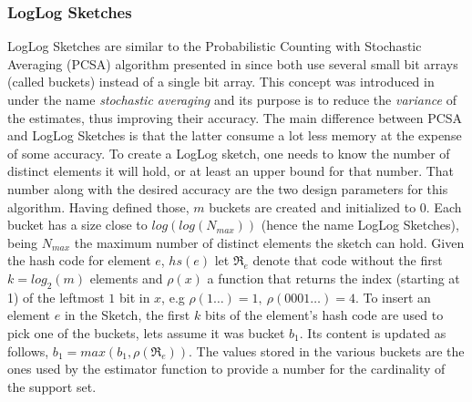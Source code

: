 \subsubsection{LogLog Sketches}
\label{sec:loglog-sketches}
LogLog Sketches \cite{Durand:2003tc} are similar to the Probabilistic
Counting with Stochastic Averaging (PCSA) algorithm presented in
\cite{Flajolet:1985wd} since both use several small bit arrays (called
buckets) instead of a single bit array. This concept was introduced in
\cite{Flajolet:1985wd} under the name \emph{stochastic averaging} and
its purpose is to reduce the \emph{variance} of the estimates, thus
improving their accuracy. The main difference between PCSA and LogLog
Sketches is that the latter consume a lot less memory at the expense
of some accuracy. To create a LogLog sketch, one needs to know the
number of distinct elements it will hold, or at least an upper bound
for that number. That number along with the desired accuracy are the
two design parameters for this algorithm. Having defined those, $m$
buckets are created and initialized to $0$. Each bucket has a size
close to $log(log(N_{max}))$ (hence the name LogLog Sketches), being
$N_{max}$ the maximum number of distinct elements the sketch can hold.
Given the hash code for element $e$, $hs(e)$ let $\mathfrak{R}_e$
denote that code without the first $k=log_2(m)$ elements and $\rho(x)$
a function that returns the index (starting at 1) of the leftmost $1$
bit in $x$, e.g $\rho(1\ldots)=1,\ \rho(0001\ldots)=4$. To insert an
element $e$ in the Sketch, the first $k$ bits of the element's hash
code are used to pick one of the buckets, lets assume it was bucket
$b_1$. Its content is updated as follows,
$b_1=max(b_1,\rho(\mathfrak{R}_e))$. The values stored in the various
buckets are the ones used by the estimator function to provide a
number for the cardinality of the support set.

